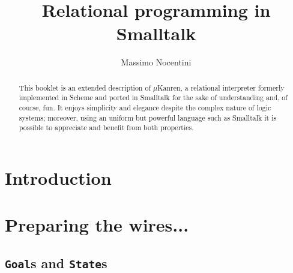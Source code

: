 \documentclass[a4paper,12pt]{article}
\author{Massimo Nocentini}
\title{Relational programming in Smalltalk}
\begin{document}
\maketitle

\begin{abstract}
This booklet is an extended description of $\mu$Kanren, a relational
interpreter formerly implemented in Scheme and ported in Smalltalk for the sake
of understanding and, of course, fun. It enjoys simplicity and elegance despite
the complex nature of logic systems; moreover, using an uniform but powerful
language such as Smalltalk it is possible to appreciate and benefit from both
properties.
\end{abstract}

\section*{Introduction}



\tableofcontents

\section{Preparing the wires...}

\subsection{\texttt{Goal}s and \texttt{State}s}
\end{document}
